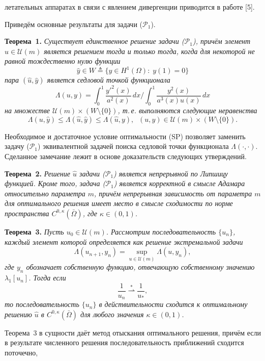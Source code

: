 летательных аппаратах в связи с явлением дивергенции
приводится в работе [5].
%
%
%
\par
Приведём основные результаты для задачи ($\mathcal{P}_1$).
\par
\textbf{Теорема~1.} {\it Существует единственное решение задачи \emph{($\mathcal{P}_1$)},
причём элемент $\hat{u} \in \mathcal{U}(m)$ является решением  тогда и только тогда,
когда
для некоторой не равной тождественно нулю функции
\[
\hat{y} \in W \triangleq \{ y \in H^1(\Omega) : \; y(1) = 0 \}
\]
пара $(\hat{u}, \hat{y})$ является седловой точкой функционала
\[
\Lambda(u, y) = \int_0^1 \frac{y'^2(x)}{a^2(x)} \, dx \Bigg/
\int_0^1 \frac{y^2(x)}{a^3(x) u(x)} \, dx
\]
на множестве
$\mathcal{U}(m) \times \left(W \setminus \{ 0 \}\right)$,
т.\,е.
выполняются следующие неравенства}
\[
\Lambda(u, \hat{y})
\leq
\Lambda(\hat{u}, \hat{y})
\leq
\Lambda(\hat{u}, y),
\;\;
(u, y) \in \mathcal{U}(m) \times \left(W \setminus \{ 0 \}\right).
\tag{SP}
\]
%
%
%
\par
Необходимое и достаточное условие оптимальности (SP) позволяет заменить задачу ($\mathcal{P}_1$)
эквивалентной задачей поиска седловой точки функционала $\Lambda(\cdot, \cdot)$.
%
%
%
Сделанное замечание лежит в основе доказательств следующих утверждений.
%
%
%
\par
\textbf{Теорема~2.} {\it Решение $\hat{u}$ задачи \emph{($\mathcal{P}_1$)}
является непрерывной по Липшицу функцией.
%
%
%
Кроме того,
задача \emph{($\mathcal{P}_1$)} является корректной в смысле Адамара относительно параметра
$m$,
причём непрерывная зависимость от параметра $m$ для оптимального решения имеет место в смысле сходимости по норме пространства $C^{0,\kappa}(\bar{\Omega})$,
где $\kappa \in (0, 1)$.
}
%
%
%
\par
\textbf{Теорема~3.} {\it Пусть $u_0 \in \mathcal{U}(m)$.
%
%
%
Рассмотрим последовательность $\{ u_n \}$, каждый элемент которой определяется как решение
экстремальной задачи
\[
\Lambda(u_{n + 1}, y_n) = \sup_{u \in \mathcal{U}(m)} \Lambda(u, y_n),
\]
где
$y_n$ обозначает собственную функцию, отвечающую собственному значению $\lambda_1[u_n]$.
%
%
%
Тогда если
\[
\frac{1}{u_n}
\overset{*}{\rightharpoonup} \frac{1}{u_*},
\]
то последовательность $\{ u_n \}$ в действительности сходится
к оптимальному решению $\hat{u}$ в $C^{0,\kappa}(\bar{\Omega})$
для любого значения $\kappa \in (0, 1)$.
}
%
%
%
\par
Теорема~3 в сущности даёт метод отыскания оптимального решения,
причём если в результате численного решения последовательность приближений
сходится поточечно,

